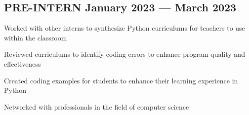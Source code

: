 \subsection{{PRE-INTERN \hfill January 2023 --- March 2023}}
\begin{zitemize}
\item Worked with other interns to synthesize Python curriculums for teachers to use within the classroom
\item Reviewed curriculums to identify coding errors to enhance program quality and effectiveness
\item Created coding examples for students to enhance their learning experience in Python
\item Networked with professionals in the field of computer science
\end{zitemize}

